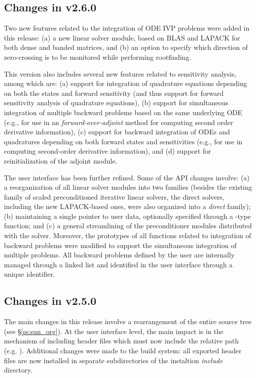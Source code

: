 \subsection*{Changes in v2.6.0}

Two new features related to the integration of ODE IVP problems were added
in this release: (a) a new linear solver module, based on BLAS and LAPACK
for both dense and banded matrices, and (b) an option to specify which direction
of zero-crossing is to be monitored while performing rootfinding.

This version also includes several new features related to sensitivity analysis,
among which are: (a) support for integration of quadrature equations depending
on both the states and forward sensitivity (and thus support for forward sensitivity
analysis of quadrature equations), (b) support for simultaneous integration of
multiple backward problems based on the same underlying ODE (e.g., for use
in an {\em forward-over-adjoint} method for computing second order derivative
information), (c) support for backward integration of ODEs and quadratures
depending on both forward states and sensitivities (e.g., for use in computing
second-order derivative information), and (d) support for reinitialization of
the adjoint module.

The user interface has been further refined. Some of the API changes involve:
(a) a reorganization of all linear solver modules into two families (besides
the existing family of scaled preconditioned iterative linear solvers,
the direct solvers, including the new LAPACK-based ones, were also organized
into a {\em direct} family); (b) maintaining a single pointer to user data,
optionally specified through a -type function; and (c) a general
streamlining of the preconditioner modules distributed with the solver.
Moreover, the prototypes of all functions related to integration of backward
problems were modified to support the simultaneous integration of multiple
problems. All backward problems defined by the user are internally managed
through a linked list and identified in the user interface through a
unique identifier.


\subsection*{Changes in v2.5.0}

The main changes in this release involve a rearrangement of the entire
{\sundials} source tree (see \S\ref{ss:sun_org}). At the user interface
level, the main impact is in the mechanism of including {\sundials} header
files which must now include the relative path (e.g. ).
Additional changes were made to the build system: all exported header files are
now installed in separate subdirectories of the instaltion {\em include} directory.

